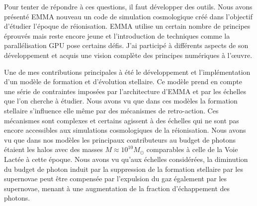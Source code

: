 Pour tenter de répondre à ces questions, il faut développer des outils.
Nous avons présenté EMMA nouveau un code de simulation cosmologique créé dans l'objectif d'étudier l'époque de réionisation.
EMMA utilise un certain nombre de principes éprouvés mais reste encore jeune et l'introduction de techniques comme la parallélisation \ac{GPU} pose certains défis.
J'ai participé à différents aspects de son développement et acquis une vision complète des principes numériques à l’œuvre.

Une de mes contributions principales à été le développement et l'implémentation d'un modèle de formation et d'évolution stellaire.
Ce modèle prend en compte une série de contraintes imposées par l’architecture d'EMMA et par les échelles que l'on cherche à étudier.
Nous avons vu que dans ces modèles la formation stellaire s'influence elle même par des mécanismes de retro-action.
Ces mécanismes sont complexes et certains agissent à des échelles qui ne sont pas encore accessibles aux simulations cosmologiques de la réionisation.
Nous avons vu que dans nos modèles les principaux contributeurs au budget de photons étaient les halos avec des masses $M \approx 10^{10}M_\odot$ comparables à celle de la Voie Lactée à cette époque.
Nous avons vu qu'aux échelles considérées, la diminution du budget de photon induit par la suppression de la formation stellaire par les supernovae peut être compensée par l'expulsion du gaz également par les supernovae, menant à une augmentation de la fraction d'échappement des photons.


